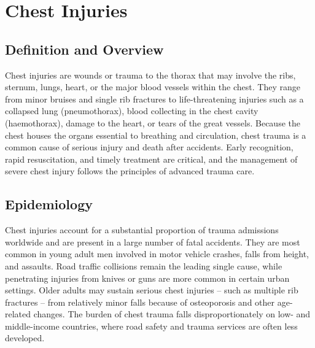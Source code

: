\chapter{Chest Injuries}

\section*{Definition and Overview}
Chest injuries are wounds or trauma to the thorax that may involve the ribs, sternum, lungs, heart, or the major blood vessels within the chest. They range from minor bruises and single rib fractures to life-threatening injuries such as a collapsed lung (pneumothorax), blood collecting in the chest cavity (haemothorax), damage to the heart, or tears of the great vessels. Because the chest houses the organs essential to breathing and circulation, chest trauma is a common cause of serious injury and death after accidents. Early recognition, rapid resuscitation, and timely treatment are critical, and the management of severe chest injury follows the principles of advanced trauma care.

\section*{Epidemiology}
Chest injuries account for a substantial proportion of trauma admissions worldwide and are present in a large number of fatal accidents. They are most common in young adult men involved in motor vehicle crashes, falls from height, and assaults. Road traffic collisions remain the leading single cause, while penetrating injuries from knives or guns are more common in certain urban settings. Older adults may sustain serious chest injuries -- such as multiple rib fractures -- from relatively minor falls because of osteoporosis and other age-related changes. The burden of chest trauma falls disproportionately on low- and middle-income countries, where road safety and trauma services are often less developed.

